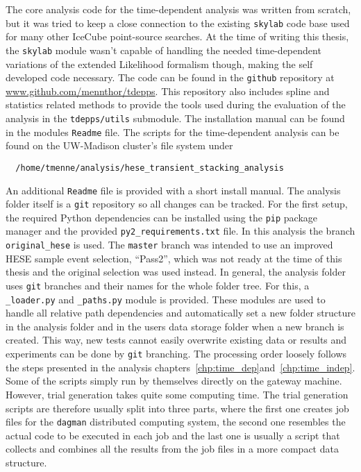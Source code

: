 The core analysis code for the time-dependent analysis was written from scratch, but it was tried to keep a close connection to the existing \lstinline!skylab! code base used for many other IceCube point-source searches.
At the time of writing this thesis, the \lstinline!skylab! module wasn't capable of handling the needed time-dependent variations of the extended Likelihood formalism though, making the self developed code necessary.
The code can be found in the \lstinline!github! repository at \url{www.github.com/mennthor/tdepps}.
This repository also includes spline and statistics related methods to provide the tools used during the evaluation of the analysis in the \lstinline!tdepps/utils! submodule.
The installation manual can be found in the modules \lstinline!Readme! file.
The scripts for the time-dependent analysis can be found on the UW-Madison cluster's file system under
\begin{lstlisting}
  /home/tmenne/analysis/hese_transient_stacking_analysis
\end{lstlisting}
An additional \lstinline!Readme! file is provided with a short install manual.
The analysis folder itself is a \lstinline!git! repository so all changes can be tracked.
For the first setup, the required Python dependencies can be installed using the \lstinline!pip! package manager and the provided \lstinline!py2_requirements.txt! file.
In this analysis the branch \lstinline!original_hese! is used.
The \lstinline!master! branch was intended to use an improved HESE sample event selection, \enquote{Pass2}, which was not ready at the time of this thesis and the original selection was used instead.
In general, the analysis folder uses \lstinline!git! branches and their names for the whole folder tree.
For this, a \lstinline!_loader.py! and \lstinline!_paths.py! module is provided.
These modules are used to handle all relative path dependencies and automatically set a new folder structure in the analysis folder and in the users data storage folder when a new branch is created.
This way, new tests cannot easily overwrite existing data or results and experiments can be done by \lstinline!git! branching.
The processing order loosely follows the steps presented in the analysis chapters~\ref{chp:time_dep}and~\ref{chp:time_indep}.
Some of the scripts simply run by themselves directly on the gateway machine.
However, trial generation takes quite some computing time.
The trial generation scripts are therefore usually split into three parts, where the first one creates job files for the \lstinline!dagman! distributed computing system, the second one resembles the actual code to be executed in each job and the last one is usually a script that collects and combines all the results from the job files in a more compact data structure.
